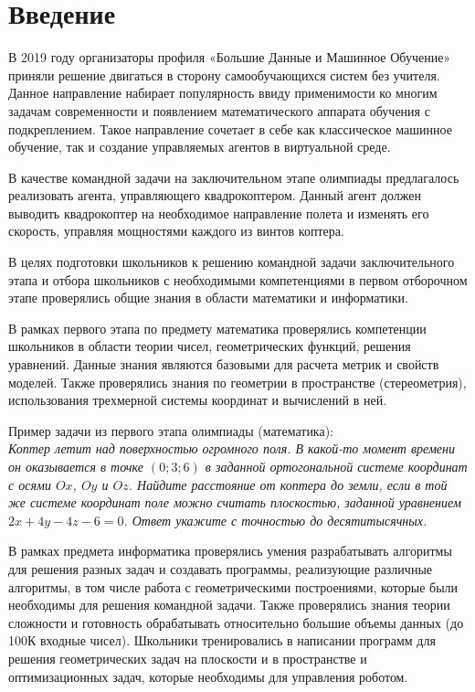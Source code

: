 %

\section*{Введение}

В 2019 году организаторы профиля «Большие Данные и Машинное Обучение»  приняли решение двигаться в сторону самообучающихся систем без учителя. Данное направление набирает популярность ввиду применимости ко многим задачам современности и появлением математического аппарата обучения с подкреплением. Такое направление сочетает в себе как классическое машинное обучение, так и создание управляемых агентов в виртуальной среде. 

В качестве командной задачи на заключительном этапе олимпиады предлагалось реализовать агента, управляющего квадрокоптером. Данный агент должен выводить квадрокоптер на необходимое направление полета и изменять его скорость, управляя мощностями каждого из винтов коптера.

В целях подготовки школьников к решению командной задачи заключительного этапа и отбора школьников с необходимыми компетенциями в первом отборочном этапе проверялись общие знания в области математики и информатики.

В рамках первого этапа по предмету математика проверялись компетенции школьников в области теории чисел, геометрических функций, решения уравнений. Данные знания являются базовыми для расчета метрик и свойств моделей. Также проверялись знания по геометрии в пространстве (стереометрия), использования трехмерной системы координат и вычислений в ней.  

Пример задачи из первого этапа олимпиады (математика):\\
\textit{Коптер летит над поверхностью огромного поля. В какой-то момент времени он оказывается в точке $(0; 3; 6)$ в заданной ортогональной системе координат с осями $Ox$, $Oy$ и $Oz$. Найдите расстояние от коптера до земли, если в той же системе координат поле можно считать плоскостью, заданной уравнением $2x+4y-4z-6 = 0$. Ответ укажите с точностью до десятитысячных.}

В рамках предмета информатика проверялись умения разрабатывать алгоритмы для решения разных задач и создавать программы, реализующие различные алгоритмы, в том числе работа с геометрическими построениями, которые были необходимы для решения командной задачи. Также проверялись знания теории сложности и готовность обрабатывать относительно большие объемы данных (до 100К входные чисел). Школьники тренировались в написании программ для решения геометрических задач на плоскости и в пространстве и оптимизационных задач, которые необходимы для управления роботом.

